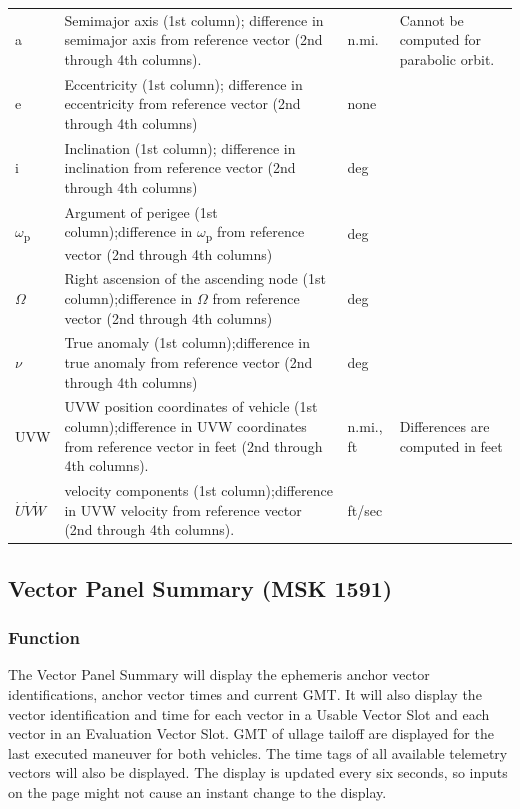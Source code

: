 \documentclass[11pt]{article} %
\begin{document}
\begin{landscape}
\begin{center}
\begin{tabular} { L{1cm} L{8cm} L{2cm} L{6cm} }
\hline
a&Semimajor axis (1st column); difference in semimajor axis from reference vector (2nd through 4th columns).&n.mi.&Cannot be computed for parabolic orbit.\\
e&Eccentricity (1st column); difference in eccentricity from reference vector (2nd through 4th columns)&none&\\
i&Inclination (1st column); difference in inclination from reference vector (2nd through 4th columns)&deg&\\
$\omega$\textsubscript{p}&Argument of perigee (1st column);difference in $\omega$\textsubscript{p} from reference vector (2nd through 4th columns)&deg&\\
$\Omega$&Right ascension of the ascending node (1st column);difference in $\Omega$ from reference vector (2nd through 4th columns)&deg&\\
$\nu$&True anomaly (1st column);difference in true anomaly from reference vector (2nd through 4th columns)&deg&\\
UVW&UVW position coordinates of vehicle (1st column);difference in UVW coordinates from reference vector in feet (2nd through 4th columns).&n.mi., ft&Differences are computed in feet\\
$\dot{U}\dot{V}\dot{W}$& velocity components (1st column);difference in UVW velocity from reference vector (2nd through 4th columns).&ft/sec&\\
\end{tabular}
\end{center}

\end{landscape}

\subsection{Vector Panel Summary (MSK 1591)}

\subsubsection{Function}

The Vector Panel Summary will display the ephemeris anchor vector identifications, anchor vector times and current GMT. It will also display the vector identification and time for each vector in a Usable Vector Slot and each vector in an Evaluation Vector Slot. GMT of ullage tailoff are displayed for the last executed maneuver for both vehicles. The time tags of all available telemetry vectors will also be displayed. The display is updated every six seconds, so inputs on the page might not cause an instant change to the display.
\end{document}

